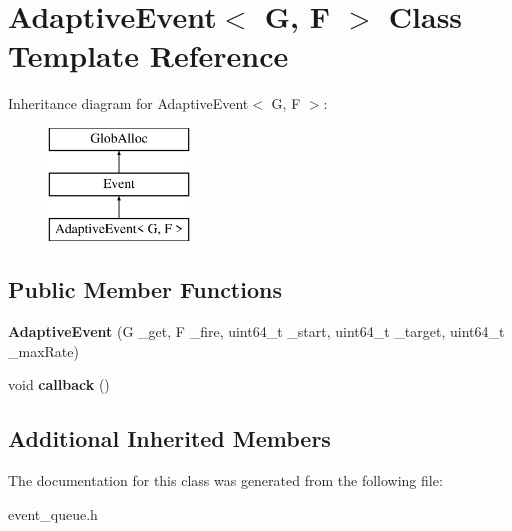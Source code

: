 \hypertarget{classAdaptiveEvent}{\section{Adaptive\-Event$<$ G, F $>$ Class Template Reference}
\label{classAdaptiveEvent}
}
Inheritance diagram for Adaptive\-Event$<$ G, F $>$\-:\begin{figure}[H]
\begin{center}
\leavevmode
\includegraphics[height=3.000000cm]{classAdaptiveEvent}
\end{center}
\end{figure}
\subsection*{Public Member Functions}
\begin{DoxyCompactItemize}
\item 
\hypertarget{classAdaptiveEvent_a7b471bbf4cc9e8e64e7e7e361e5d7d82}{{\bfseries Adaptive\-Event} (G \-\_\-get, F \-\_\-fire, uint64\-\_\-t \-\_\-start, uint64\-\_\-t \-\_\-target, uint64\-\_\-t \-\_\-max\-Rate)}\label{classAdaptiveEvent_a7b471bbf4cc9e8e64e7e7e361e5d7d82}

\item 
\hypertarget{classAdaptiveEvent_ad59239ff5a5a2284754edc3cdb42514e}{void {\bfseries callback} ()}\label{classAdaptiveEvent_ad59239ff5a5a2284754edc3cdb42514e}

\end{DoxyCompactItemize}
\subsection*{Additional Inherited Members}


The documentation for this class was generated from the following file\-:\begin{DoxyCompactItemize}
\item 
event\-\_\-queue.\-h\end{DoxyCompactItemize}
